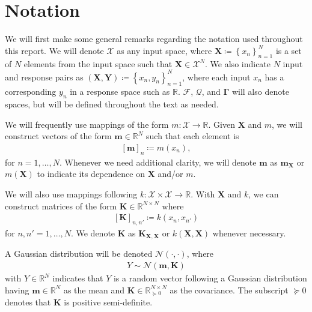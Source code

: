 \documentclass{article}
\numberwithin{equation}{section}
\begin{document}

\newpage
\tableofcontents
\newpage
{}
\setcounter{page}{1}
\setcounter{section}{-1}


\newpage
\section{Notation}
We will first make some general remarks regarding the notation used throughout this report. 
We will denote $\mathcal{X}$ as any input space, where $\mathbf{X} \coloneqq \left\{x_n\right\}_{n=1}^N$ is a set of $N$ elements from the input space such that $\mathbf{X} \in \mathcal{X}^N$.
We also indicate $N$ input and response pairs as $\left(\mathbf{X}, \mathbf{Y}\right) \coloneqq \left\{x_n, y_n\right\}_{n=1}^N$, where each input $x_n$ has a corresponding $y_n$ in a response space such as $\mathbb{R}$.
$\boldsymbol{\boldsymbol{\mathcal{F}}}$, $\boldsymbol{\mathcal{Q}}$, and $\boldsymbol{\Gamma}$ will also denote spaces, but will be defined throughout the text as needed.

We will frequently use mappings of the form $m: \mathcal{X} \rightarrow \mathbb{R}$. 
Given $\mathbf{X}$ and $m$, we will construct vectors of the form $\mathbf{m} \in \mathbb{R}^N$ such that each element is
\begin{align}
    \left[\mathbf{m}\right]_{n} \coloneqq m(x_n),
\end{align}
for $n=1,\dots, N$. Whenever we need additional clarity, we will denote $\mathbf{m}$ as $\mathbf{m}_{\mathbf{X}}$ or $m\left(\mathbf{X}\right)$ to indicate its dependence on $\mathbf{X}$ and/or $m$.

We will also use mappings following $k: \mathcal{X} \times \mathcal{X} \rightarrow \mathbb{R}$.
With $\mathbf{X}$ and $k$, we can construct matrices of the form $\mathbf{K} \in \mathbb{R}^{N\times N}$ where
\begin{align}
    \left[\mathbf{K}\right]_{n, n'} \coloneqq k(x_n, x_{n'})
\end{align}
for $n, n'=1,\dots,N$. 
We denote $\mathbf{K}$ as $\mathbf{K}_{\mathbf{X}, \mathbf{X}}$ or $k\left(\mathbf{X}, \mathbf{X}\right)$ whenever necessary.

A Gaussian distribution will be denoted $\mathcal{N}(\cdot, \cdot)$, where 
\begin{align}
    Y \sim \mathcal{N}(\mathbf{m}, \mathbf{K})
\end{align}
with $Y \in \mathbb{R}^N$ indicates that $Y$ is a random vector following a Gaussian distribution having $\mathbf{m} \in \mathbb{R}^N$ as the mean and $\mathbf{K} \in \mathbb{R}^{N \times N}_{\succcurlyeq 0}$ as the covariance. 
The subscript ${\succcurlyeq 0}$ denotes that $\mathbf{K}$ is positive semi-definite.
\end{document}

